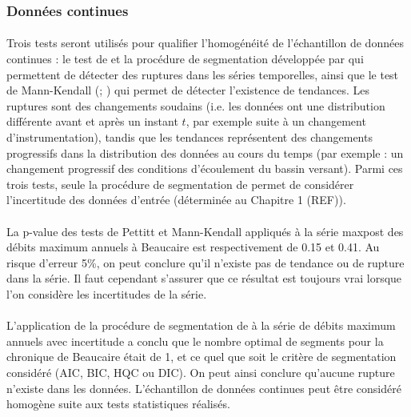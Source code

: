 \documentclass[11pt]{article}
\begin{document}
	\subsubsection{Données continues}
	
	\paragraph{} Trois tests seront utilisés pour qualifier l'homogénéité de l'échantillon de données continues : le test de \citet{pettitt_non-parametric_1979} et la procédure de segmentation développée par \citet{darienzo_detection_2021-1} qui permettent de détecter des ruptures dans les séries temporelles, ainsi que le test de Mann-Kendall (\citet{mann_nonparametric_1945}; \citet{kendall_rank_1948}) qui permet de détecter l'existence de tendances. Les ruptures sont des changements soudains (i.e. les données ont une distribution différente avant et après un instant $t$, par exemple suite à un changement d'instrumentation), tandis que les tendances représentent des changements progressifs dans la distribution des données au cours du temps (par exemple : un changement progressif des conditions d'écoulement du bassin versant). Parmi ces trois tests, seule la procédure de segmentation de \citet{darienzo_detection_2021-1} permet de considérer l'incertitude des données d'entrée (déterminée au Chapitre 1 (REF)).
	
	\paragraph{} La p-value des tests de Pettitt et Mann-Kendall appliqués à la série maxpost des débits maximum annuels à Beaucaire est respectivement de 0.15 et 0.41. Au risque d'erreur 5\%, on peut conclure qu'il n'existe pas de tendance ou de rupture dans la série. Il faut cependant s'assurer que ce résultat est toujours vrai lorsque l'on considère les incertitudes de la série.
			
	\paragraph{} L'application de la procédure de segmentation de \citet{darienzo_detection_2021-1} à la série de débits maximum annuels avec incertitude a conclu que le nombre optimal de segments pour la chronique de Beaucaire était de 1, et ce quel que soit le critère de segmentation considéré (AIC, BIC, HQC ou DIC). On peut ainsi conclure qu'aucune rupture n'existe dans les données. L'échantillon de données continues peut être considéré homogène suite aux tests statistiques réalisés. 
	
\end{document}
